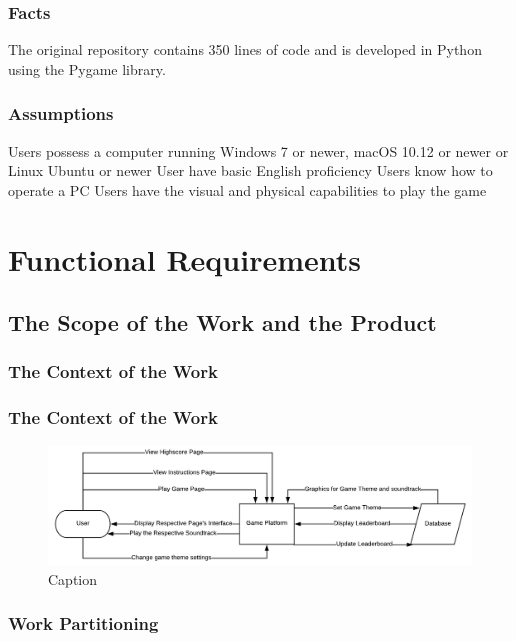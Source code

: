\documentclass{article}
\begin{document}
\subsubsection{Facts}
The original repository contains 350 lines of code and is developed in Python using the Pygame library. 
\subsubsection{Assumptions}
Users possess a computer running Windows 7 or newer, macOS 10.12 or newer or Linux Ubuntu or newer
User have basic English proficiency 
Users know how to operate a PC
Users have the visual and physical capabilities to play the game



\section{Functional Requirements}

\subsection{The Scope of the Work and the Product}



\subsubsection{The Context of the Work}
\subsubsection{The Context of the Work}
\begin{figure}[!ht]
	\centering
	\includegraphics{context_diagram.png}
	\caption{Caption}
\end{figure}
\subsubsection{Work Partitioning}
\end{document}
